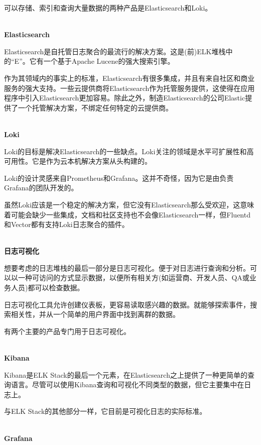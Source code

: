 可以存储、索引和查询大量数据的两种产品是Elasticsearch和Loki。

\hspace*{\fill} \\ %
\noindent
\textbf{Elasticsearch}

Elasticsearch是自托管日志聚合的最流行的解决方案。这是(前)ELK堆栈中的“E”。它有一个基于Apache Lucene的强大搜索引擎。

作为其领域内的事实上的标准，Elasticsearch有很多集成，并且有来自社区和商业服务的强大支持。一些云提供商将Elasticsearch作为托管服务提供，这使得在应用程序中引入Elasticsearch更加容易。除此之外，制造Elasticsearch的公司Elastic提供了一个托管解决方案，不绑定任何特定的云提供商。

\hspace*{\fill} \\ %
\noindent
\textbf{Loki}

Loki的目标是解决Elasticsearch的一些缺点。Loki关注的领域是水平可扩展性和高可用性。它是作为云本机解决方案从头构建的。

Loki的设计灵感来自Prometheus和Grafana。这并不奇怪，因为它是由负责Grafana的团队开发的。

虽然Loki应该是一个稳定的解决方案，但它没有Elasticsearch那么受欢迎，这意味着可能会缺少一些集成，文档和社区支持也不会像Elasticsearch一样，但Fluentd和Vector都有支持Loki日志聚合的插件。

\hspace*{\fill} \\ %
\noindent
\textbf{日志可视化}

想要考虑的日志堆栈的最后一部分是日志可视化。便于对日志进行查询和分析。可以以一种可访问的方式显示数据，以便所有相关方(如运营商、开发人员、QA或业务人员)都可以检查数据。

日志可视化工具允许创建仪表板，更容易读取感兴趣的数据。就能够探索事件，搜索相关性，并从一个简单的用户界面中找到离群的数据。

有两个主要的产品专门用于日志可视化。

\hspace*{\fill} \\ %
\noindent
\textbf{Kibana}

Kibana是ELK Stack的最后一个元素，在Elasticsearch之上提供了一种更简单的查询语言。尽管可以使用Kibana查询和可视化不同类型的数据，但它主要集中在日志上。

与ELK Stack的其他部分一样，它目前是可视化日志的实际标准。

\hspace*{\fill} \\ %
\noindent
\textbf{Grafana}

